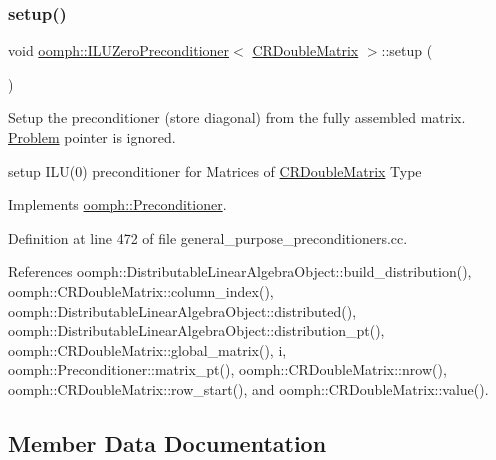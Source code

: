 \mbox{\label{classoomph_1_1ILUZeroPreconditioner_3_01CRDoubleMatrix_01_4_a2398a8674540bfdb8d69a699085107d8}} 
\subsubsection{\texorpdfstring{setup()}{setup()}}
{\footnotesize\ttfamily void \hyperlink{classoomph_1_1ILUZeroPreconditioner}{oomph\+::\+I\+L\+U\+Zero\+Preconditioner}$<$ \hyperlink{classoomph_1_1CRDoubleMatrix}{C\+R\+Double\+Matrix} $>$\+::setup (\begin{DoxyParamCaption}{ }\end{DoxyParamCaption})\hspace{0.3cm}{\ttfamily [virtual]}}



Setup the preconditioner (store diagonal) from the fully assembled matrix. \hyperlink{classoomph_1_1Problem}{Problem} pointer is ignored. 

setup I\+L\+U(0) preconditioner for Matrices of \hyperlink{classoomph_1_1CRDoubleMatrix}{C\+R\+Double\+Matrix} Type 

Implements \hyperlink{classoomph_1_1Preconditioner_af4886f4efe510e5c9b0eb19422943588}{oomph\+::\+Preconditioner}.



Definition at line 472 of file general\+\_\+purpose\+\_\+preconditioners.\+cc.



References oomph\+::\+Distributable\+Linear\+Algebra\+Object\+::build\+\_\+distribution(), oomph\+::\+C\+R\+Double\+Matrix\+::column\+\_\+index(), oomph\+::\+Distributable\+Linear\+Algebra\+Object\+::distributed(), oomph\+::\+Distributable\+Linear\+Algebra\+Object\+::distribution\+\_\+pt(), oomph\+::\+C\+R\+Double\+Matrix\+::global\+\_\+matrix(), i, oomph\+::\+Preconditioner\+::matrix\+\_\+pt(), oomph\+::\+C\+R\+Double\+Matrix\+::nrow(), oomph\+::\+C\+R\+Double\+Matrix\+::row\+\_\+start(), and oomph\+::\+C\+R\+Double\+Matrix\+::value().



\subsection{Member Data Documentation}
\mbox{\label{classoomph_1_1ILUZeroPreconditioner_3_01CRDoubleMatrix_01_4_acede3cb504db79c1e43635826d2328f7}} 
